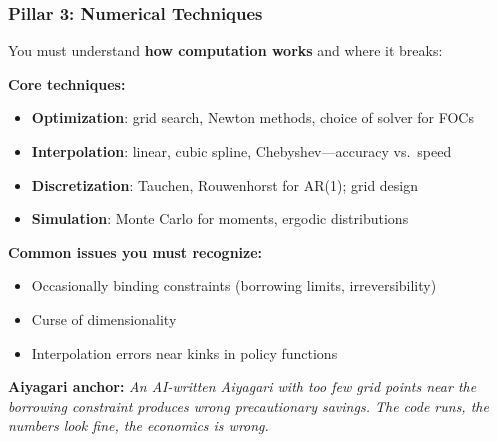 \documentclass[10pt,english,aspectratio=169]{beamer}
\begin{document}
\begin{frame}
\frametitle{Pillar 3: Numerical Techniques}

You must understand \textbf{how computation works} and where it breaks:

\vspace{0.2cm}

\textbf{Core techniques:}
\begin{itemize}
    \item \textbf{Optimization}: grid search, Newton methods, choice of solver for FOCs
    \item \textbf{Interpolation}: linear, cubic spline, Chebyshev---accuracy vs.\ speed
    \item \textbf{Discretization}: Tauchen, Rouwenhorst for AR(1); grid design
    \item \textbf{Simulation}: Monte Carlo for moments, ergodic distributions
\end{itemize}

\textbf{Common issues you must recognize:}
\begin{itemize}
    \item Occasionally binding constraints (borrowing limits, irreversibility)
    \item Curse of dimensionality
    \item Interpolation errors near kinks in policy functions
\end{itemize}

\vspace{0.2cm}

\textbf{Aiyagari anchor:} \textit{An AI-written Aiyagari with too few grid points near the borrowing constraint produces wrong precautionary savings. The code runs, the numbers look fine, the economics is wrong.}
\end{frame}
\end{document}
